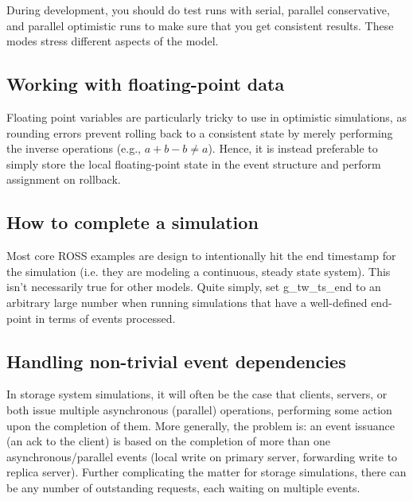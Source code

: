 \documentclass[conference,10pt,compsocconf,onecolumn]{IEEEtran}
\begin{document}
During development, you should do test runs with serial, parallel conservative,
and parallel optimistic runs to make sure that you get consistent results.
These modes stress different aspects of the model.

\subsection{Working with floating-point data}

Floating point variables are particularly tricky to use in optimistic
simulations, as rounding errors prevent rolling back to a consistent state by
merely performing the inverse operations (e.g., $a+b-b \neq a$). Hence, it is
instead preferable to simply store the local floating-point state in the event
structure and perform assignment on rollback.

\subsection{How to complete a simulation}

Most core ROSS examples are design to intentionally hit
the end timestamp for the simulation (i.e. they are modeling a continuous,
steady state system). This isn't necessarily true for other models. Quite
simply, set g\_tw\_ts\_end to an arbitrary large number when running simulations
that have a well-defined end-point in terms of events processed. 

\begin{comment} ROSS takes care of this
\subsection{Kicking off a simulation}
\label{sec_kickoff}

TOOD: fill this in.  Each LP needs to send an event to itself at the
beginning of the simulation (explain why).  We usually skew these with
random numbers to help break ties right off the bat (explain why).
\end{comment}

\subsection{Handling non-trivial event dependencies}

In storage system simulations, it will often be the case that clients, servers,
or both issue multiple asynchronous (parallel) operations, performing some
action upon the completion of them. More generally, the problem is: an event
issuance (an ack to the client) is based on the completion of more than one
asynchronous/parallel events (local write on primary server, forwarding write to
replica server). Further complicating the matter for storage simulations, there
can be any number of outstanding requests, each waiting on multiple events. 
\end{document}
